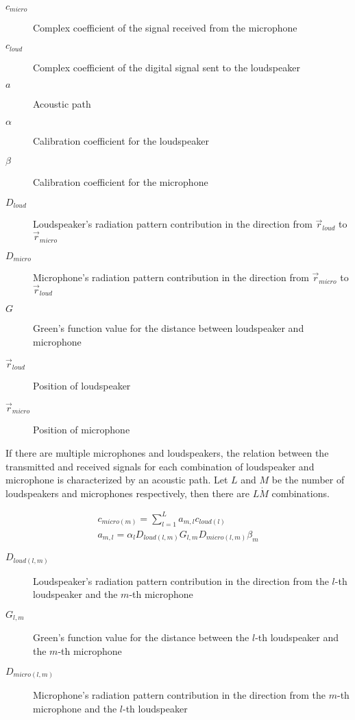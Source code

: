 \begin{description}
	\item[$c_\mathit{micro}$] Complex coefficient of the signal received from the microphone
	\item[$c_\mathit{loud}$] Complex coefficient of the digital signal sent to the loudspeaker
	\item[$a$] Acoustic path
	\item[$\alpha$] Calibration coefficient for the loudspeaker
	\item[$\beta$] Calibration coefficient for the microphone
	\item[$D_{loud}$] Loudspeaker's radiation pattern contribution in the direction from $\vec{r}_{loud}$ to $\vec{r}_{micro}$
	\item[$D_{micro}$] Microphone's radiation pattern contribution in the direction from $\vec{r}_{micro}$ to $\vec{r}_{loud}$ 
	\item[$G$] Green's function value for the distance between loudspeaker and microphone
	\item[$\vec{r}_{loud}$] Position of loudspeaker
	\item[$\vec{r}_{micro}$] Position of microphone
\end{description}

If there are multiple microphones and loudspeakers, the relation between the transmitted and received signals for each combination of loudspeaker and microphone is characterized by an acoustic path. Let $L$ and $M$ be the number of loudspeakers and microphones respectively, then there are $L \dot M$ combinations.

\begin{gather}
c_{\mathit{micro} (m)} = \sum_{l = 1}^{L} a_{m,l} c_{\mathit{loud} (l)} \label{transEquationCalibrationConcrete} \\
a_{m,l} = \alpha_l D_{loud(l,m)} G_{l,m} D_{micro(l,m)} \beta_m
\label{acPathTheoric}
\end{gather}

\begin{description}
	\item[$D_{loud(l,m)}$] Loudspeaker's radiation pattern contribution in the direction from the $l$-th loudspeaker and the $m$-th microphone
	\item[$G_{l,m}$] Green's function value for the distance between the $l$-th loudspeaker and the $m$-th microphone
	\item[$D_{micro(l,m)}$] Microphone's radiation pattern contribution in the direction from the $m$-th microphone and the $l$-th loudspeaker
\end{description}

